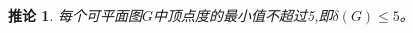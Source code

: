 \documentclass{article}
\begin{document}
\begin{CJK}{UTF8}{gbsn}
  \Large
\newtheorem*{cor}{推论}
  \begin{cor}
          每个可平面图$G$中顶点度的最小值不超过5,即$\delta (G) \leq 5$。
  \end{cor}


\end{CJK}
\end{document}
